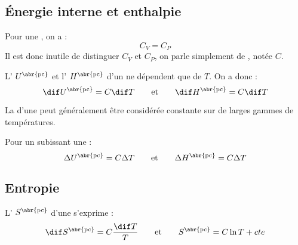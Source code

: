 \subsection{Énergie interne et enthalpie}

\begin{propriete}
Pour une , on a :
\[C_V = C_P\]
Il est donc inutile de distinguer $C_V$ et $C_P$, on parle simplement de , notée $C$.
\end{propriete}

\begin{propriete}[admis]
L' $U^{\text{\abr{pc}}}$ et l' $H^{\text{\abr{pc}}}$ d'un  ne dépendent que de $T$. On a donc :
\[\dif U^{\text{\abr{pc}}} = C \dif T \qquad \text{et} \qquad \dif H^{\text{\abr{pc}}} = C \dif T\]
\end{propriete}

\begin{remarque}
La  d'une  peut généralement être considérée constante sur de larges gammes de températures.
\end{remarque}

\begin{propriete}
Pour un  subissant une  :
\[\Delta U^{\text{\abr{pc}}} = C \Delta T \qquad \text{et} \qquad \Delta H^{\text{\abr{pc}}} = C \Delta T\]
\end{propriete}



\subsection{Entropie}

\begin{propriete}
L' $S^{\text{\abr{pc}}}$ d'une  s'exprime :
\[\dif S^{\text{\abr{pc}}} = C \frac{\dif T}{T} \qquad \text{et} \qquad S^{\text{\abr{pc}}} = C \ln T + cte\]
\end{propriete}